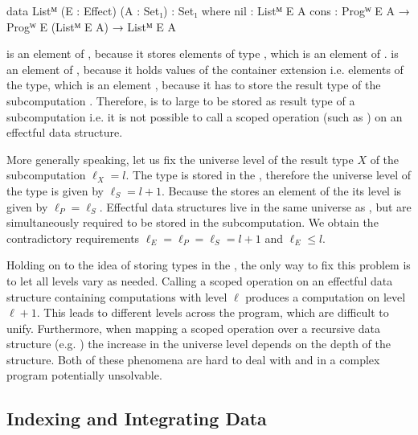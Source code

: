 \begin{code}
data Listᴹ (E : Effect) (A : Set₁) : Set₁ where
  nil   : Listᴹ E A
  cons  : Progᵂ E A → Progᵂ E (Listᴹ E A) → Listᴹ E A
\end{code}
\AgdaSpace{}\AgdaSpace{} is
an element of , because it stores elements of type
\AgdaSpace{}\AgdaSpace{},
which is an element of .
\AgdaSpace{}\AgdaSpace{} is
an element of , because it holds values of the container
extension i.e. elements of the  type, which is an element
, because it has to store the result type of the
subcomputation .
Therefore,
\AgdaSpace{}\AgdaSpace{} is
to large to be stored as result type of a subcomputation i.e. it is not possible
to call a scoped operation (such as ) on an effectful data
structure.

More generally speaking, let us fix the universe level of the result type $X$ of
the subcomputation $\ell_X = l$.
The type is stored in the , therefore the universe level of the
 type is given by $\ell_S = l + 1$.
Because the  stores an element of the  its
level is given by $\ell_P = \ell_S$.
Effectful data structures live in the same universe as , but
are simultaneously required to be stored in the subcomputation.
We obtain the contradictory requirements $\ell_E = \ell_P = \ell_S = l + 1$ and
$\ell_E  \leqslant l$.

Holding on to the idea of storing types in the , the only way to
fix this problem is to let all levels vary as needed.
Calling a scoped operation on an effectful data structure containing
computations with level $\ell$ produces a computation on level $\ell + 1$.
This leads to different levels across the program, which are difficult to unify.
Furthermore, when mapping a scoped operation over a recursive data structure
(e.g. ) the increase in the universe level depends on the
depth of the structure.
Both of these phenomena are hard to deal with and in a complex program
potentially unsolvable.


\subsection{Indexing and Integrating Data}
\label{higher-order:fixes}


